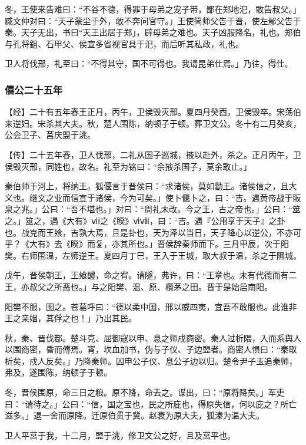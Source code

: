 \documentclass[]{article}
\begin{document}
冬，王使来告难曰：``不谷不德，得罪于母弟之宠子带，鄙在郑地汜，敢告叔父。」臧文仲对曰：``天子蒙尘于外，敢不奔问官守。」王使简师父告于晋，使左鄢父告于秦。天子无出，书曰``天王出居于郑」，辟母弟之难也。天子凶服降名，礼也。郑伯与孔将鉏、石甲父、侯宣多省视官具于汜，而后听其私政，礼也。

卫人将伐邢，礼至曰：``不得其守，国不可得也。我请昆弟仕焉。」乃往，得仕。

\hypertarget{header-n929}{%
\subsubsection{僖公二十五年}\label{header-n929}}

【经】二十有五年春王正月，丙午，卫侯毁灭邢。夏四月癸酉，卫侯毁卒。宋荡伯来逆妇。宋杀其大夫。秋，楚人围陈，纳顿子于顿。葬卫文公。冬十有二月癸亥，公会卫子、莒庆盟于洮。

【传】二十五年春，卫人伐邢，二礼从国子巡城，掖以赴外，杀之。正月丙午，卫侯毁灭邢，同姓也，故名。礼至为铭曰：``余掖杀国子，莫余敢止。」

秦伯师于河上，将纳王。狐偃言于晋侯曰：``求诸侯，莫如勤王。诸侯信之，且大义也。继文之业而信宣于诸侯，今为可矣。」使卜偃卜之，曰：``吉。遇黄帝战于阪泉之兆。」公曰：``吾不堪也。」对曰：``周礼未改。今之王，古之帝也。」公曰：``筮之。」筮之，遇《大有》ⅵⅰ之《睽》ⅵⅷ，曰：``吉。遇『公用享于天子』之卦也。战克而王飨，吉孰大焉，且是卦也，天为泽以当日，天子降心以逆公，不亦可乎？《大有》去《睽》而复，亦其所也。」晋侯辞秦师而下。三月甲辰，次于阳樊。右师围温，左师逆王。夏四月丁巳，王入于王城，取大叔于温，杀之于隰城。

戊午，晋侯朝王，王飨醴，命之宥。请隧，弗许，曰：``王章也。未有代德而有二王，亦叔父之所恶也。」与之阳樊、温、原、欑茅之田。晋于是始启南阳。

阳樊不服，围之。苍葛呼曰：``德以柔中国，邢以威四夷，宜吾不敢服也。此谁非王之亲姻，其俘之也！」乃出其民。

秋，秦、晋伐鄀。楚斗克、屈御寇以申、息之师戍商密。秦人过析隈，入而系舆人以围商密，昏而傅焉。宵，坎血加书，伪与子仪、子边盟者。商密人惧曰：``秦取析矣，戍人反矣。」乃降秦师。囚申公子仪、息公子边以归。楚令尹子玉追秦师，弗及，遂围陈，纳顿子于顿。

冬，晋侯围原，命三日之粮。原不降，命去之。谍出，曰：``原将降矣。」军吏曰：``请待之。」公曰：``信，国之宝也，民之所庇也，得原失信，何以庇之？所亡滋多。」退一舍而原降。迁原伯贯于冀。赵衰为原大夫，狐溱为温大夫。

卫人平莒于我，十二月，盟于洮，修卫文公之好，且及莒平也。
\end{document}
